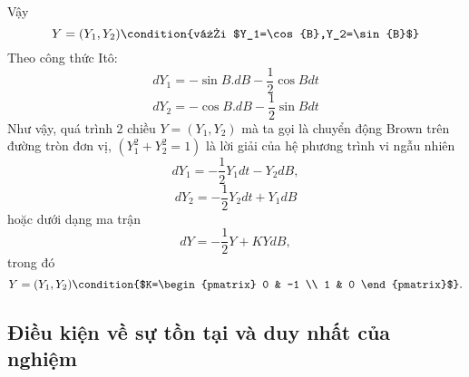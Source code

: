 \documentclass[a4paper]{article}
\numberwithin{equation}{section}
\begin{document}
Vậy
\begin{equation*}
	Y=(Y_1,Y_2) \condition{với $Y_1=\cos{B},Y_2=\sin{B}$}
\end{equation*}
Theo công thức Itô:
\begin{equation*}
	dY_1=-\sin{B.dB}-\dfrac{1}{2}\cos{B}dt
\end{equation*}
\begin{equation*}
	dY_2=-\cos{B.dB}-\dfrac{1}{2}\sin{B}dt
\end{equation*}
Như vậy, quá trình 2 chiều $Y=(Y_1,Y_2)$ mà ta gọi là chuyển động Brown trên đường tròn đơn vị, $(Y_1^2+Y_2^2=1)$ là lời giải của hệ phương trình vi ngẫu nhiên
\begin{equation*}
	dY_1=-\dfrac{1}{2}Y_1dt-Y_2dB,
\end{equation*}
\begin{equation*}
	dY_2=-\dfrac{1}{2}Y_2dt+Y_1dB
\end{equation*}
hoặc dưới dạng ma trận
\begin{equation*}
	dY=-\dfrac{1}{2}Y+KYdB,
\end{equation*} 
trong đó
\begin{equation*}
	Y=(Y_1,Y_2)\condition{$K=\begin{pmatrix} 0 & -1 \\ 1 & 0 \end{pmatrix}$}.
\end{equation*}
\subsection{Điều kiện về sự tồn tại và duy nhất của nghiệm}
\end{document}
